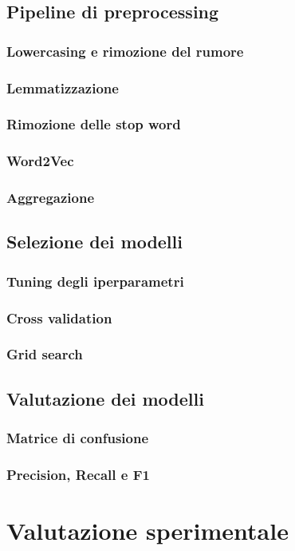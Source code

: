 \documentclass[12pt]{report}
\theoremstyle{definition}
\begin{document}
\section{Pipeline di preprocessing}
\subsection{Lowercasing e rimozione del rumore}
\subsection{Lemmatizzazione}
\subsection{Rimozione delle stop word}
\subsection{Word2Vec}
\subsection{Aggregazione}
\section{Selezione dei modelli}
\subsection{Tuning degli iperparametri}
\subsection{Cross validation}
\subsection{Grid search}
\section{Valutazione dei modelli}
\subsection{Matrice di confusione}
\subsection{Precision, Recall e F1}

\chapter{Valutazione sperimentale}
\label{Capitolo 4}
\onehalfspacing
\end{document}
